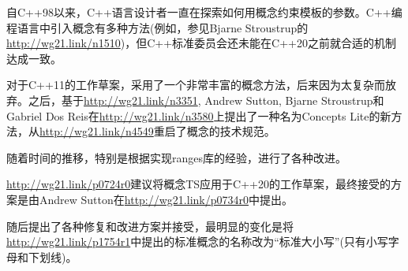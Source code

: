 自C++98以来，C++语言设计者一直在探索如何用概念约束模板的参数。C++编程语言中引入概念有多种方法(例如，参见Bjarne Stroustrup的\url{http://wg21.link/n1510})，但C++标准委员会还未能在C++20之前就合适的机制达成一致。

对于C++11的工作草案，采用了一个非常丰富的概念方法，后来因为太复杂而放弃。之后，基于\url{http://wg21.link/n3351}, Andrew Sutton, Bjarne Stroustrup和Gabriel Dos Reis在\url{http://wg21.link/n3580}上提出了一种名为Concepts Lite的新方法，从\url{http://wg21.link/n4549}重启了概念的技术规范。

随着时间的推移，特别是根据实现ranges库的经验，进行了各种改进。

\url{http://wg21.link/p0724r0}建议将概念TS应用于C++20的工作草案，最终接受的方案是由Andrew Sutton在\url{http://wg21.link/p0734r0}中提出。

随后提出了各种修复和改进方案并接受，最明显的变化是将\url{http://wg21.link/p1754r1}中提出的标准概念的名称改为“标准大小写”(只有小写字母和下划线)。
